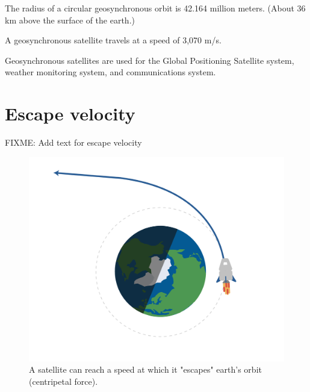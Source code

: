 The radius of a circular geosynchronous orbit is 42.164 million
meters. (About 36 km above the surface of the earth.)

A geosynchronous satellite travels at a speed of 3,070 m/s.

Geosynchronous satellites are used for the Global Positioning
Satellite system, weather monitoring system, and communications
system.
\section{Escape velocity}
FIXME: Add text for escape velocity
\begin{figure}[htbp]
    \centering
    \includegraphics[width=.75\textwidth]{escape.png}
    \caption{A satellite can reach a speed at which it "escapes" earth's orbit (centripetal force).}
    \label{fig:escape}
\end{figure}


